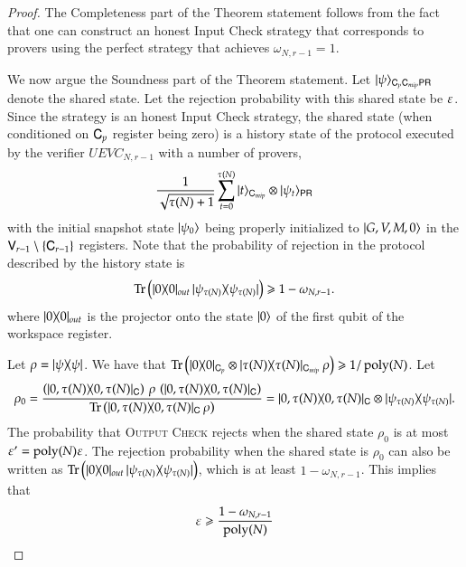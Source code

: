 \begin{proof}
The Completeness part of the Theorem statement follows from the fact that one can construct an honest Input Check strategy that corresponds to provers using the perfect strategy that achieves $\omega_{N,r-1} = 1$.

We now argue the Soundness part of the Theorem statement. Let $|\psi\rangle_{{\mathsf{C}}_p {\mathsf{C}}_{mip} {\mathsf{P}} {\mathsf{R}}}$ denote the shared state. Let the rejection probability with this shared state be $\varepsilon$. Since the strategy is an honest Input Check strategy, the shared state (when conditioned on ${\mathsf{C}}_p$ register being zero) is a history state of the protocol executed by the verifier $UEVC_{N,r-1}$ with a number of provers,
\[
\frac{1}{\sqrt{\tau(N) + 1}} \sum_{t = 0}^{\tau(N)} |t\rangle_{{\mathsf{C}}_{mip}} \otimes |\psi_t\rangle_{{\mathsf{P}} {\mathsf{R}}}
\]
with the initial snapshot state $|\psi_0\rangle$ being properly initialized to $|G,V,M,0\rangle$ in the ${\mathsf{V}}_{r-1} \setminus \{ {\mathsf{C}}_{r-1} \}$ registers. Note that the probability of rejection in the protocol described by the history state is 
\[
	\operatorname{Tr} \left ( |0\rangle\! \langle 0|_{out} \, |\psi_{\tau(N)}\rangle\! \langle \psi_{\tau(N)}| \right) \geqslant 1 - \omega_{N,r-1}.
\]
where $|0\rangle\! \langle 0|_{out}$ is the projector onto the state $|0\rangle$ of the first qubit of the workspace register.

Let $\rho = |\psi\rangle\! \langle \psi|$. We have that $\operatorname{Tr} \left (  |0\rangle\! \langle 0|_{{\mathsf{C}}_p} \otimes |\tau(N)\rangle\! \langle \tau(N)|_{{\mathsf{C}}_{mip}} \, \rho \right) \geqslant 1/\operatorname{poly}(N)$. Let
\[
\rho_0 = \frac{\left (|0,\tau(N)\rangle\! \langle 0,\tau(N)|_{{\mathsf{C}}} \right) \, \rho \, \left ( |0,\tau(N)\rangle\! \langle 0,\tau(N)|_{{\mathsf{C}}} \right)}{\operatorname{Tr} \left (  |0,\tau(N)\rangle\! \langle 0,\tau(N)|_{{\mathsf{C}}}\, \rho \right)} = |0,\tau(N)\rangle\! \langle 0,\tau(N)|_{{\mathsf{C}}} \otimes |\psi_{\tau(N)}\rangle\! \langle \psi_{\tau(N)}|.
\]
The probability that \textsc{Output Check} rejects when the shared state $\rho_0$ is at most $\varepsilon' = \operatorname{poly}(N) \varepsilon$. The rejection probability when the shared state is $\rho_0$ can also be written as $\operatorname{Tr} \left ( |0\rangle\! \langle 0|_{out} \, |\psi_{\tau(N)}\rangle\! \langle \psi_{\tau(N)}| \right)$, which is at least $1 - \omega_{N,r-1}$. This implies that
\[
	\varepsilon \geqslant \frac{1 - \omega_{N,r-1}}{\operatorname{poly}(N)}
\]


\end{proof}


